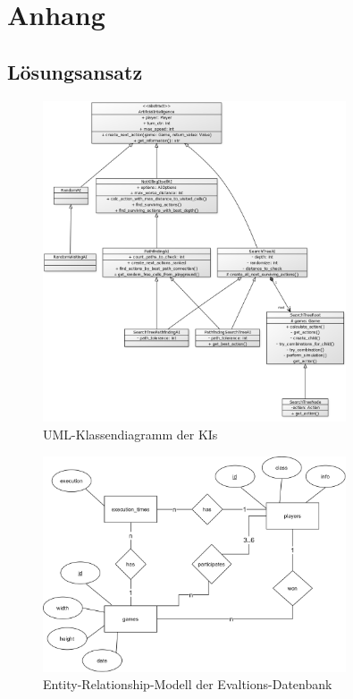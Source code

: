 \chapter{Anhang}
\label{ch:anhang}

\section{Lösungsansatz}
\label{sec:anhang-loesungsansatz}

\begin{figure}[htb]
\centering
\includegraphics[width=0.8\textwidth]{Bilder/Klassendiagramm_AIs.png}
\caption{UML-Klassendiagramm der \ac{KI}s}
\label{fig:klassendiagramm-AIs}
\end{figure}

\begin{figure}[htb]
\centering
\includegraphics[width=0.8\textwidth]{Bilder/er-diagram.png}
\caption{Entity-Relationship-Modell der Evaltions-Datenbank}
\label{fig:er-schema}
\end{figure}

